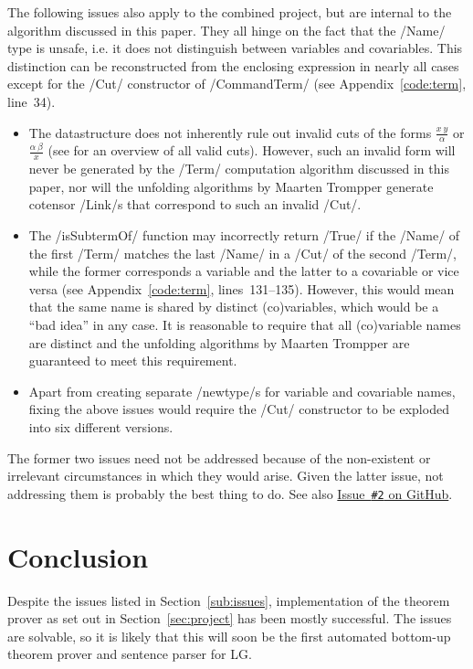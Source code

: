 \documentclass[12pt,a4paper]{article}
\begin{document}
The following issues also apply to the combined project, but are internal to the algorithm discussed in this paper. They all hinge on the fact that the \hs/Name/ type is unsafe, i.e. it does not distinguish between variables and covariables. This distinction can be reconstructed from the enclosing expression in nearly all cases except for the \hs/Cut/ constructor of \hs/CommandTerm/ (see Appendix~\ref{code:term}, line~34).
\begin{itemize}
    \item The datastructure does not inherently rule out invalid cuts of the forms $\frac{x\ y}{\alpha}$ or $\frac{\alpha\ \beta}{x}$ (see \cite[p.~24]{mm12} for an overview of all valid cuts). However, such an invalid form will never be generated by the \hs/Term/ computation algorithm discussed in this paper, nor will the unfolding algorithms by Maarten Trompper generate cotensor \hs/Link/s that correspond to such an invalid \hs/Cut/.
    \item The \hs/isSubtermOf/ function may incorrectly return \hs/True/ if the \hs/Name/ of the first \hs/Term/ matches the last \hs/Name/ in a \hs/Cut/ of the second \hs/Term/, while the former corresponds a variable and the latter to a covariable or vice versa (see Appendix~\ref{code:term}, lines~131--135). However, this would mean that the same name is shared by distinct (co)variables, which would be a ``bad idea'' in any case. It is reasonable to require that all (co)variable names are distinct and the unfolding algorithms by Maarten Trompper are guaranteed to meet this requirement.
    \item Apart from creating separate \hs/newtype/s for variable and covariable names, fixing the above issues would require the \hs/Cut/ constructor to be exploded into six different versions.
\end{itemize}
The former two issues need not be addressed because of the non-existent or irrelevant circumstances in which they would arise. Given the latter issue, not addressing them is probably the best thing to do. See also \href{https://github.com/jgonggrijp/net-prove/issues/2}{Issue~\texttt{\#2} on GitHub}.


\section{Conclusion}

Despite the issues listed in Section~\ref{sub:issues}, implementation of the theorem prover as set out in Section~\ref{sec:project} has been mostly successful. The issues are solvable, so it is likely that this will soon be the first automated bottom-up theorem prover and sentence parser for LG.
\end{document}
